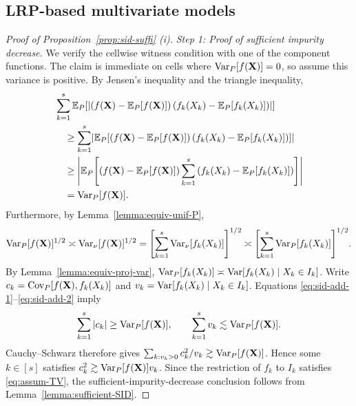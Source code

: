 \documentclass[11pt]{article}
\theoremstyle{plain}
\theoremstyle{definition}
\theoremstyle{remark}
\theoremstyle{plain}
\newcommand{\bX}{\mathbf{X}}
\DeclarePairedDelimiter{\bracks}{[}{]}
\DeclarePairedDelimiter{\abs}{|}{|}
\newcommand{\E}{\mathbb{E}}
\newcommand{\Var}{\textnormal{Var}}
\newcommand{\Cov}{\textnormal{Cov}}
\newcommand{\1}{\mathbbm{1}}
\begin{document}
\subsection{LRP-based multivariate models}

\begin{proof}[Proof of Proposition~\ref{prop:sid-suffi} (i)]
    \textit{Step 1: Proof of sufficient impurity decrease.}
    We verify the cellwise witness condition with one of the
    component functions.  The claim is immediate on cells where
    $\Var_P[f(\bX)]=0$, so assume this variance is positive.
    By Jensen's inequality and the triangle inequality,
    \begin{equation}\label{eq:sid-add-1}
    \begin{aligned}
        &\sum_{k=1}^s \E_P\bracks*{ \left| \left( f(\bX) - \E_P\bracks*{f(\bX)} \right) \left( f_k(X_k) - \E_P\bracks*{f_k(X_k)} \right) \right| } \\
        &\quad \geq \sum_{k=1}^s \abs*{ \E_P\bracks*{ \left( f(\bX) - \E_P\bracks*{f(\bX)} \right) \left( f_k(X_k) - \E_P\bracks*{f_k(X_k)} \right) } } \\
        &\quad \geq \abs*{ \E_P\bracks*{ \left( f(\bX) - \E_P\bracks*{f(\bX)} \right) \sum_{k=1}^s \left( f_k(X_k) - \E_P\bracks*{f_k(X_k)} \right) } } \\
        &\quad = \Var_P[f(\bX)].
    \end{aligned}
    \end{equation}
    Furthermore, by Lemma~\ref{lemma:equiv-unif-P},
    \begin{equation}\label{eq:sid-add-2}
        \Var_P[f(\bX)]^{1/2} \asymp\Var_{\nu}[f(\bX)]^{1/2}
        = \bracks*{\sum_{k=1}^s \Var_{\nu}[f_k(X_k)]}^{1/2}
        \asymp \bracks*{\sum_{k=1}^s \Var_P[f_k(X_k)]}^{1/2}.
    \end{equation}
    By Lemma~\ref{lemma:equiv-proj-var},
    $\Var_P[f_k(X_k)]\asymp
    \Var[f_k(X_k)\mid X_k\in I_k]$.  Write
    $c_k=\Cov_P[f(\bX),f_k(X_k)]$ and
    $v_k=\Var[f_k(X_k)\mid X_k\in I_k]$.  Equations
    \eqref{eq:sid-add-1}--\eqref{eq:sid-add-2} imply
    \[
        \sum_{k=1}^s|c_k|\ge \Var_P[f(\bX)],
        \qquad
        \sum_{k=1}^s v_k\lesssim \Var_P[f(\bX)].
    \]
    Cauchy--Schwarz therefore gives
    $\sum_{k:v_k>0}c_k^2/v_k\gtrsim\Var_P[f(\bX)]$.
    Hence some $k\in[s]$ satisfies
    $c_k^2\gtrsim\Var_P[f(\bX)]v_k$.  Since
    the restriction of $f_k$ to $I_k$ satisfies
    \eqref{eq:assum-TV}, the sufficient-impurity-decrease
    conclusion follows from Lemma~\ref{lemma:sufficient-SID}.


\end{proof}
\end{document}
